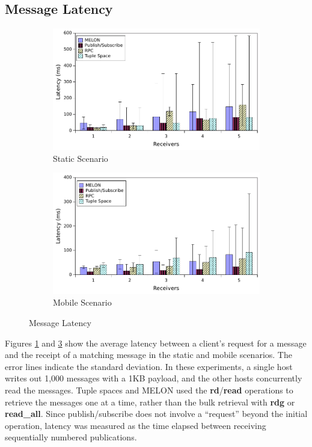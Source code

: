 \documentclass[lnicst]{svmultln}
\begin{document}
\subsection{Message Latency}

\begin{figure}
\centering

\begin{subfigure}{.5\textwidth}
\centering
\includegraphics[width = \linewidth, clip, trim = 0px 0px 0px 0px]{figures/latency_static.pdf}
\caption{Static Scenario}
\label{fig:latencystatic}
\end{subfigure}%
\begin{subfigure}{.5\textwidth}
\centering
\includegraphics[width = \linewidth, clip, trim = 0px 0px 0px 0px]{figures/latency_mobile.pdf}
\caption{Mobile Scenario}
\label{fig:latencymobile}
\end{subfigure}

\caption{Message Latency}
\end{figure}

Figures \ref{fig:latencystatic} and \ref{fig:latencymobile} show the average latency between a client's request for a message and the receipt of a matching message in the static and mobile scenarios. The error lines indicate the standard deviation. In these experiments, a single host writes out 1,000 messages with a 1KB payload, and the other hosts concurrently read the messages. Tuple spaces and MELON used the \textbf{rd}/\textbf{read} operations to retrieve the messages one at a time, rather than the bulk retrieval with \textbf{rdg} or \textbf{read\_all}. Since publish/subscribe does not involve a ``request'' beyond the initial operation, latency was measured as the time elapsed between receiving sequentially numbered publications.
\end{document}
